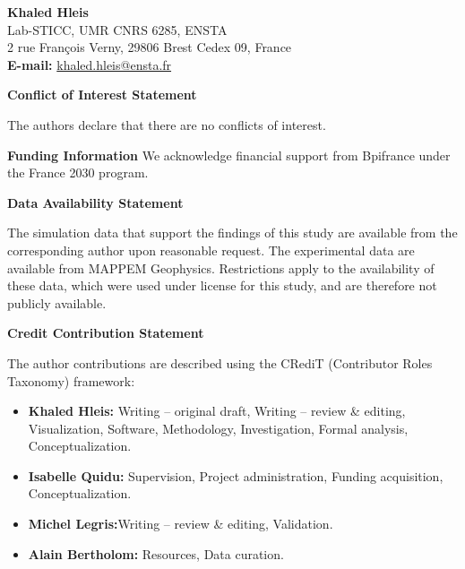 \textbf{Khaled Hleis}\\
Lab-STICC, UMR CNRS 6285, ENSTA\\
2 rue François Verny, 29806 Brest Cedex 09, France\\[4pt]
\textbf{E-mail:} \href{mailto:khaled.hleis@ensta.fr}{khaled.hleis@ensta.fr}
 
\vspace{0.8cm}
 
\textbf{ \color{ietblue} {Conflict of Interest Statement}}
 
The authors declare that there are no conflicts of interest.
 
\vspace{0.8cm}
 
\textbf{ \color{ietblue} {Funding Information}}
We acknowledge financial support from Bpifrance under the France 2030 program.
 
\vspace{0.8cm}
 
\textbf{ \color{ietblue} {Data Availability Statement}}

The simulation data that support the findings of this study are available from the corresponding author upon reasonable request. The experimental data are available from MAPPEM Geophysics. Restrictions apply to the availability of these data, which were used under license for this study, and are therefore not publicly available.

 
\vspace{0.8cm}
 
\textbf{ \color{ietblue} {Credit Contribution Statement}}
 
The author contributions are described using the CRediT (Contributor Roles Taxonomy)
framework:
 
\begin{itemize}
  \item \textbf{Khaled Hleis:} Writing – original draft, Writing – review \& editing, Visualization, Software, Methodology, Investigation, Formal analysis, Conceptualization.
  \item \textbf{Isabelle Quidu:} Supervision, Project administration, Funding acquisition, Conceptualization.
  \item \textbf{Michel Legris:}Writing – review \& editing, Validation.
  \item \textbf{Alain Bertholom:} Resources, Data curation.
\end{itemize}
 